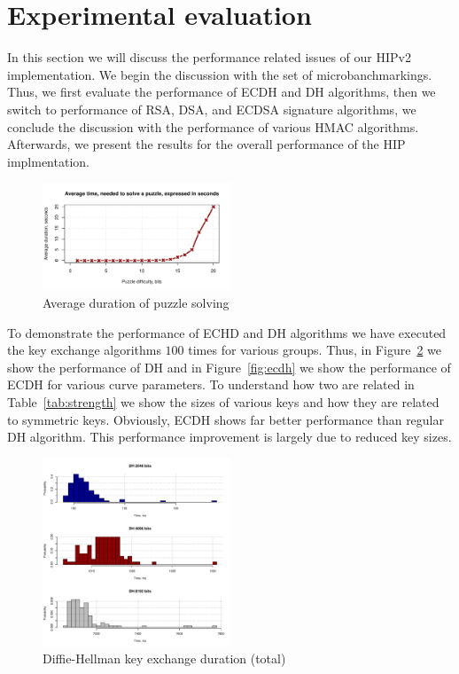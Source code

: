 \section{Experimental evaluation}
\label{section:experiments}

In this section we will discuss the performance related issues of our 
HIPv2 implementation. We begin the discussion with the set of 
microbanchmarkings. Thus, we first evaluate the performance of ECDH and DH
algorithms, then we switch to performance of RSA, DSA, and ECDSA signature
algorithms, we conclude the discussion with the performance of various HMAC 
algorithms. Afterwards, we present the results for the overall performance 
of the HIP implmentation.

\begin{figure}
	\includegraphics[width=0.5\textwidth]{graphics/puzzle_solution_perf.pdf}
	\caption{Average duration of puzzle solving}
	\label{fig:puzzle}
\end{figure}

To demonstrate the performance of ECHD and DH algorithms we have 
executed the key exchange algorithms $100$ times for various 
groups. Thus, in Figure~\ref{fig:dh} we show the performance of
DH and in Figure~\ref{fig:ecdh} we show the performance 
of ECDH for various curve parameters. To understand how two
are related in Table~\ref{tab:strength} we show the sizes
of various keys and how they are related to symmetric keys.
Obviously, ECDH shows far better performance than regular
DH algorithm. This performance improvement is largely due
to reduced key sizes.

\begin{figure}
	\includegraphics[width=0.5\textwidth]{graphics/dh_computation_hist.pdf}
	\caption{Diffie-Hellman key exchange duration (total)}
	\label{fig:dh}
\end{figure}

